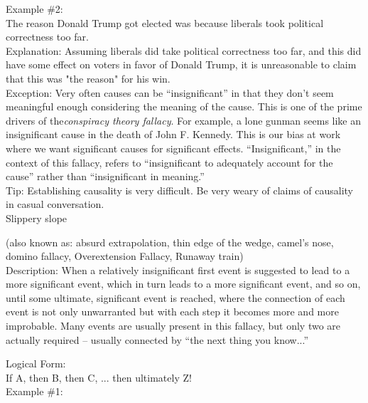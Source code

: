 \documentclass[a4paper,12pt,single,pdftex]{scrartcl}
\begin{document}
    
      Example \#2:
    \\

    
      The reason Donald Trump got elected was because liberals took political correctness too far.
    \\

    
      Explanation: Assuming liberals did take political correctness too far, and this did have some effect on voters in favor of Donald Trump, it is unreasonable to claim that this was "the reason" for his win.
    \\

    
      Exception: Very often causes can be “insignificant” in that they don’t seem meaningful enough considering the meaning of the cause. This is one of the prime drivers of the{\em  {\it conspiracy theory}  fallacy}. For example, a lone gunman seems like an insignificant  cause in the death of John F. Kennedy. This is our bias at work where we want significant causes for significant effects. “Insignificant,” in the context of this fallacy, refers to “insignificant to adequately account for the cause” rather than “insignificant in meaning.”
    \\

    
      Tip: Establishing causality is very difficult. Be very weary of claims of causality in casual conversation.
    \\

  

Slippery slope
    
      (also known as: absurd extrapolation, thin edge of the wedge, camel's nose, domino fallacy, Overextension Fallacy, Runaway train)
    \\

  
    Description: When a relatively insignificant first event is suggested to lead to a more significant event, which in turn leads to a more significant event, and so on, until some ultimate, significant event is reached, where the connection of each event is not only unwarranted but with each step it becomes more and more improbable.  Many events are usually present in this fallacy, but only two are actually required -- usually connected by “the next thing you know...”

    
      Logical Form:
    \\

    
      If A, then B, then C, ... then ultimately Z!
    \\

    
      Example \#1:
    \\
\end{document}
